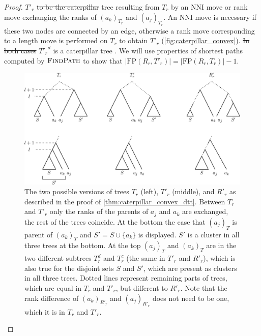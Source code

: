 \documentclass[11pt]{amsart}
\newcommand{\findpath}{\textsc{FindPath}}
\newcommand{\nni}{\mathrm{NNI}}
\newcommand{\fp}{\mathrm{FP}}
\providecommand{\DIFaddtex}[1]{{\protect\color{blue}\uwave{#1}}} %
\providecommand{\DIFdeltex}[1]{{\protect\color{red}\sout{#1}}}                      %
\providecommand{\DIFaddbegin}{} %
\providecommand{\DIFaddend}{} %
\providecommand{\DIFdelbegin}{} %
\providecommand{\DIFdelend}{} %
\providecommand{\DIFadd}[1]{\texorpdfstring{\DIFaddtex{#1}}{#1}} %
\providecommand{\DIFdel}[1]{\texorpdfstring{\DIFdeltex{#1}}{}} %
\newcommand{\DIFscaledelfig}{0.5}
\newlength{\DIFdelgraphicswidth} %
\newlength{\DIFdelgraphicsheight} %
\newcommand{\DIFaddincludegraphics}[2][]{{\color{blue}\fbox{\DIFOincludegraphics[#1]{#2}}}} %
\newcommand{\DIFdelincludegraphics}[2][]{%
\sbox{\DIFdelgraphicsbox}{\DIFOincludegraphics[#1]{#2}}%
\settoboxwidth{\DIFdelgraphicswidth}{\DIFdelgraphicsbox} %
\settoboxtotalheight{\DIFdelgraphicsheight}{\DIFdelgraphicsbox} %
\scalebox{\DIFscaledelfig}{%
\parbox[b]{\DIFdelgraphicswidth}{\usebox{\DIFdelgraphicsbox}\\[-\baselineskip] \rule{\DIFdelgraphicswidth}{0em}}\llap{\resizebox{\DIFdelgraphicswidth}{\DIFdelgraphicsheight}{%
\setlength{\unitlength}{\DIFdelgraphicswidth}%
\begin{picture}(1,1)%
\thicklines\linethickness{2pt} %
{\color[rgb]{1,0,0}\put(0,0){\framebox(1,1){}}}%
{\color[rgb]{1,0,0}\put(0,0){\line( 1,1){1}}}%
{\color[rgb]{1,0,0}\put(0,1){\line(1,-1){1}}}%
\end{picture}%
}\hspace*{3pt}}} %
} %
\DeclareRobustCommand{\DIFaddbegin}{\DIFOaddbegin \let\includegraphics\DIFaddincludegraphics} %
\DeclareRobustCommand{\DIFaddend}{\DIFOaddend \let\includegraphics\DIFOincludegraphics} %
\DeclareRobustCommand{\DIFdelbegin}{\DIFOdelbegin \let\includegraphics\DIFdelincludegraphics} %
\DeclareRobustCommand{\DIFdelend}{\DIFOaddend \let\includegraphics\DIFOincludegraphics} %
\begin{document}
\begin{proof}
	\DIFadd{Let }\DIFaddend $T'_r$ \DIFdelbegin \DIFdel{to be the caterpillar }\DIFdelend \DIFaddbegin \DIFadd{be the }\DIFaddend tree resulting from $T_r$ by an $\nni$ move or rank move exchanging the ranks of $(a_k)_{T_r}$ and $(a_j)_{T_r}$.
	An $\nni$ move is necessary if these two nodes are connected by an edge, otherwise a rank move corresponding to a length move is performed on $T_r$ to obtain $T'_r$ (\autoref{fig:caterpillar_convex}).
	\DIFdelbegin \DIFdel{In both cases }\DIFdelend ${T'_r}^d$ is a caterpillar tree \DIFaddbegin \DIFadd{in both cases}\DIFaddend .
	We will use properties of shortest paths computed by $\findpath$ to show that $|\fp(R_r,T'_r)| = |\fp(R_r,T_r)| - 1$.

	\begin{figure}[ht]
		\includegraphics[width=1\textwidth]{caterpillar_convex.eps}
		\caption{The two possible versions of trees $T_r$ (left), $T'_r$ (middle), and $R'_r$ as described in the proof of \autoref{thm:caterpillar_convex_dtt}.
		Between $T_r$ and $T'_r$ only the ranks of the parents of $a_j$ and $a_k$ are exchanged, the rest of the trees coincide.
		At the bottom the case that $(a_j)_T$ is parent of $(a_k)_T$ and $S' = S \cup \{a_k\}$ is displayed.
		$S'$ is a cluster in all three trees at the bottom.
		At the top $(a_j)_T$ and $(a_k)_T$ are in the two different subtrees $T_r^d$ and $T_r^c$ (the same in $T'_r$ and $R'_r$), which is also true for the disjoint sets $S$ and $S'$, which are present as clusters in all three trees.
		Dotted lines represent remaining parts of trees, which are equal in $T_r$ and $T'_r$, but different to $R'_r$.
		Note that the rank difference of $(a_k)_{R'_r}$ and $(a_j)_{R'_r}$ does not need to be one, which it is in $T_r$ and $T'_r$.
		\label{fig:caterpillar_convex}}
	\end{figure}


\end{proof}
\end{document}
